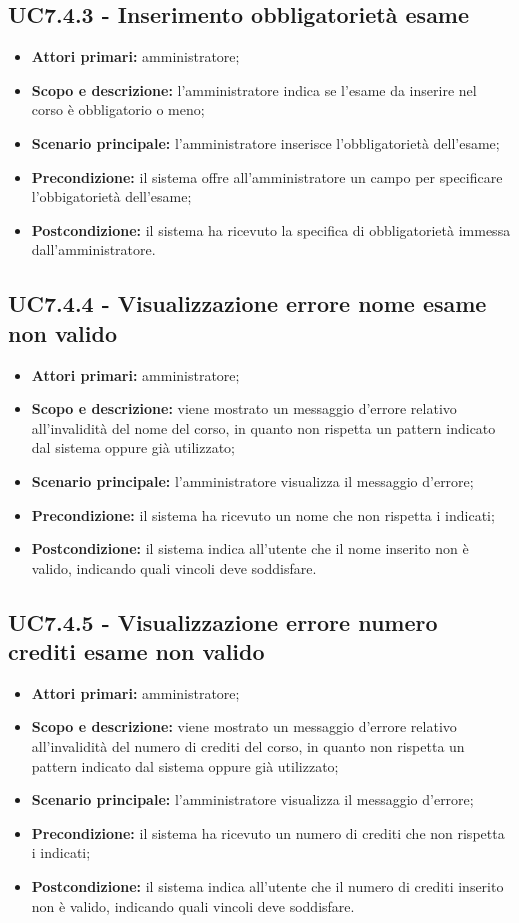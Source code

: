\documentclass[AnalisiDeiRequisiti.tex]{subfiles}
\begin{document}
\subsection{UC7.4.3 - Inserimento obbligatorietà esame}
\begin{itemize}
	\item \textbf{Attori primari:} amministratore;
	\item \textbf{Scopo e descrizione:} l'amministratore indica se l'esame da inserire nel corso è obbligatorio o meno;
	\item \textbf{Scenario principale:} l'amministratore inserisce l'obbligatorietà dell'esame;
	\item \textbf{Precondizione:} il sistema offre all'amministratore un campo per specificare l'obbigatorietà dell'esame; 
	\item \textbf{Postcondizione:} il sistema ha ricevuto la specifica di obbligatorietà immessa dall'amministratore.
\end{itemize}
\subsection{UC7.4.4 - Visualizzazione errore nome esame non valido}
\begin{itemize}
	\item \textbf{Attori primari:} amministratore;
	\item \textbf{Scopo e descrizione:} viene mostrato un messaggio d'errore relativo all'invalidità del nome del corso, in quanto non rispetta un pattern indicato dal sistema oppure già utilizzato;
	\item \textbf{Scenario principale:} l'amministratore visualizza il messaggio d'errore;
	\item \textbf{Precondizione:} il sistema ha ricevuto un nome che non rispetta i  indicati; 
	\item \textbf{Postcondizione:} il sistema indica all'utente che il nome inserito non è valido, indicando quali vincoli deve soddisfare.
\end{itemize}
\subsection{UC7.4.5 - Visualizzazione errore numero crediti esame non valido}
\begin{itemize}
	\item \textbf{Attori primari:} amministratore;
	\item \textbf{Scopo e descrizione:} viene mostrato un messaggio d'errore relativo all'invalidità del numero di crediti del corso, in quanto non rispetta un pattern indicato dal sistema oppure già utilizzato;
	\item \textbf{Scenario principale:} l'amministratore visualizza il messaggio d'errore;
	\item \textbf{Precondizione:} il sistema ha ricevuto un numero di crediti che non rispetta i  indicati; 
	\item \textbf{Postcondizione:} il sistema indica all'utente che il numero di crediti inserito non è valido, indicando quali vincoli deve soddisfare.
\end{itemize}
\end{document}
